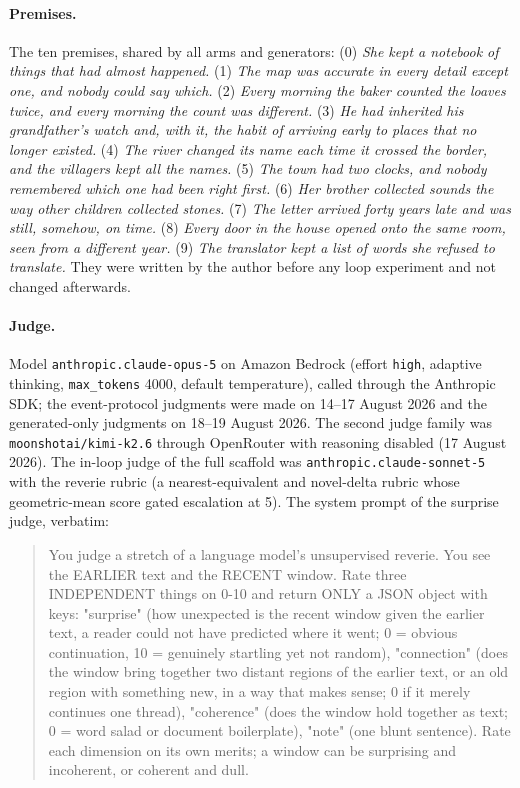 \paragraph{Premises.} The ten premises, shared by all arms and generators:
(0) \emph{She kept a notebook of things that had almost happened.} (1)
\emph{The map was accurate in every detail except one, and nobody could say
which.} (2) \emph{Every morning the baker counted the loaves twice, and every
morning the count was different.} (3) \emph{He had inherited his grandfather's
watch and, with it, the habit of arriving early to places that no longer
existed.} (4) \emph{The river changed its name each time it crossed the
border, and the villagers kept all the names.} (5) \emph{The town had two
clocks, and nobody remembered which one had been right first.} (6) \emph{Her
brother collected sounds the way other children collected stones.} (7)
\emph{The letter arrived forty years late and was still, somehow, on time.}
(8) \emph{Every door in the house opened onto the same room, seen from a
different year.} (9) \emph{The translator kept a list of words she refused to
translate.} They were written by the author before any loop experiment and
not changed afterwards.

\paragraph{Judge.} Model \texttt{anthropic.claude-opus-5} on Amazon Bedrock
(effort \texttt{high}, adaptive thinking, \texttt{max\_tokens} 4000, default
temperature), called through the Anthropic SDK; the event-protocol judgments
were made on 14--17 August 2026 and the generated-only judgments on 18--19
August 2026. The second judge family was \texttt{moonshotai/kimi-k2.6}
through OpenRouter with reasoning disabled (17 August 2026). The in-loop judge
of the full scaffold was \texttt{anthropic.claude-sonnet-5} with the reverie
rubric (a nearest-equivalent and novel-delta rubric whose geometric-mean score
gated escalation at 5). The system prompt of the surprise judge, verbatim:

\begin{quote}\small\ttfamily
You judge a stretch of a language model's unsupervised reverie. You see the
EARLIER text and the RECENT window. Rate three INDEPENDENT things on 0-10 and
return ONLY a JSON object with keys: "surprise" (how unexpected is the recent
window given the earlier text, a reader could not have predicted where it
went; 0 = obvious continuation, 10 = genuinely startling yet not random),
"connection" (does the window bring together two distant regions of the
earlier text, or an old region with something new, in a way that makes sense;
0 if it merely continues one thread), "coherence" (does the window hold
together as text; 0 = word salad or document boilerplate), "note" (one blunt
sentence). Rate each dimension on its own merits; a window can be surprising
and incoherent, or coherent and dull.
\end{quote}

